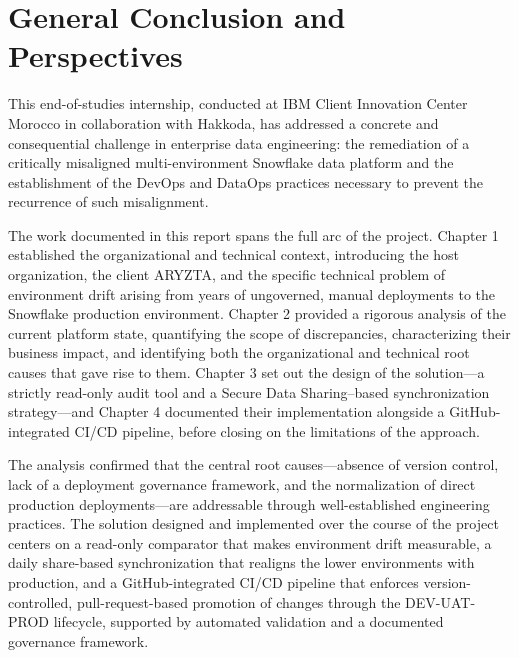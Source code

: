 \chapter*{General Conclusion and Perspectives}

This end-of-studies internship, conducted at IBM Client Innovation Center Morocco in collaboration with Hakkoda, has addressed a concrete and consequential challenge in enterprise data engineering: the remediation of a critically misaligned multi-environment Snowflake data platform and the establishment of the DevOps and DataOps practices necessary to prevent the recurrence of such misalignment.

The work documented in this report spans the full arc of the project. Chapter 1 established the organizational and technical context, introducing the host organization, the client ARYZTA, and the specific technical problem of environment drift arising from years of ungoverned, manual deployments to the Snowflake production environment. Chapter 2 provided a rigorous analysis of the current platform state, quantifying the scope of discrepancies, characterizing their business impact, and identifying both the organizational and technical root causes that gave rise to them. Chapter 3 set out the design of the solution---a strictly read-only audit tool and a Secure Data Sharing--based synchronization strategy---and Chapter 4 documented their implementation alongside a GitHub-integrated CI/CD pipeline, before closing on the limitations of the approach.

The analysis confirmed that the central root causes---absence of version control, lack of a deployment governance framework, and the normalization of direct production deployments---are addressable through well-established engineering practices. The solution designed and implemented over the course of the project centers on a read-only comparator that makes environment drift measurable, a daily share-based synchronization that realigns the lower environments with production, and a GitHub-integrated CI/CD pipeline that enforces version-controlled, pull-request-based promotion of changes through the DEV-UAT-PROD lifecycle, supported by automated validation and a documented governance framework.

